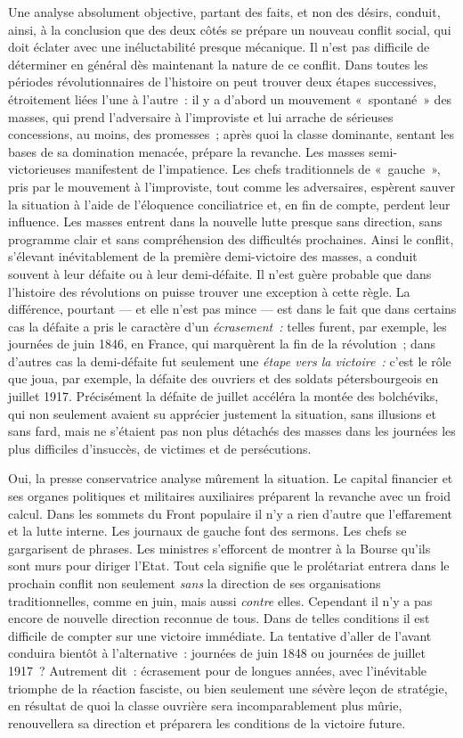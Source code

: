 \documentclass[french,twoside]{book} %
\begin{document}
Une analyse absolument objective, partant des faits, et non des désirs, conduit, ainsi, à la conclusion que des deux côtés se prépare un nouveau conflit social, qui doit éclater avec une inéluctabilité presque mécanique. Il n’est pas difficile de déterminer en général dès maintenant la nature de ce conflit. Dans toutes les périodes révolutionnaires de l’histoire on peut trouver deux étapes successives, étroitement liées l’une à l’autre : il y a d’abord un mouvement « spontané » des masses, qui prend l’adversaire à l’improviste et lui arrache de sérieuses concessions, au moins, des promesses ; après quoi la classe dominante, sentant les bases de sa domination menacée, prépare la revanche. Les masses semi-victorieuses manifestent de l’impatience. Les chefs traditionnels  de « gauche », pris par le mouvement à l’improviste, tout comme les adversaires, espèrent sauver la situation à l’aide de l’éloquence conciliatrice et, en fin de compte, perdent leur influence. Les masses entrent dans la nouvelle lutte presque sans direction, sans programme clair et sans compréhension des difficultés prochaines. Ainsi le conflit, s’élevant inévitablement de la première demi-victoire des masses, a conduit souvent à leur défaite ou à leur demi-défaite. Il n’est guère probable que dans l’histoire des révolutions on puisse trouver une exception à cette règle. La différence, pourtant — et elle n’est pas mince — est dans le fait que dans certains cas la défaite a pris le caractère d’un \emph{écrasement :} telles furent, par exemple, les journées de juin 1846, en France, qui marquèrent la fin de la révolution ; dans d’autres cas la demi-défaite fut seulement une \emph{étape vers la victoire :} c’est le rôle que joua, par exemple, la défaite des ouvriers et des soldats pétersbourgeois en juillet 1917. Précisément la défaite de juillet accéléra la montée des bolchéviks, qui non seulement avaient su apprécier justement la situation, sans illusions et sans fard, mais ne s’étaient pas non plus détachés des masses dans les journées les plus difficiles d’insuccès, de victimes et de persécutions.\par
Oui, la presse conservatrice analyse mûrement la situation. Le capital financier et ses organes politiques et militaires auxiliaires préparent la revanche avec un froid calcul. Dans les sommets du Front populaire il n’y a rien d’autre que l’effarement et la lutte interne. Les journaux de gauche font des sermons. Les chefs se gargarisent de phrases. Les ministres s’efforcent de montrer à la Bourse qu’ils sont murs pour diriger l’Etat. Tout cela signifie que le prolétariat entrera dans le prochain conflit non seulement \emph{sans} la direction de ses organisations traditionnelles, comme en juin, mais aussi \emph{contre} elles. Cependant  il n’y a pas encore de nouvelle direction reconnue de tous. Dans de telles conditions il est difficile de compter sur une victoire immédiate. La tentative d’aller de l’avant conduira bientôt à l’alternative : journées de juin 1848 ou journées de juillet 1917 ? Autrement dit : écrasement pour de longues années, avec l’inévitable triomphe de la réaction fasciste, ou bien seulement une sévère leçon de stratégie, en résultat de quoi la classe ouvrière sera incomparablement plus mûrie, renouvellera sa direction et préparera les conditions de la victoire future.\par
\end{document}
